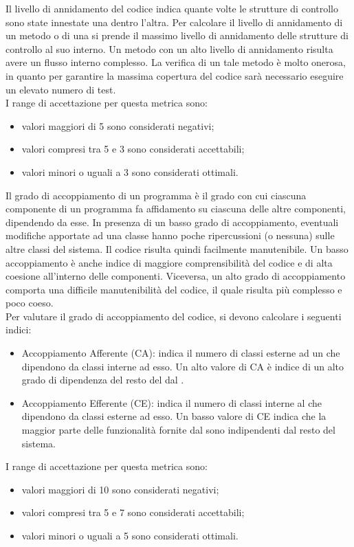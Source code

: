 			 \label{subsec:livAnnidamento}
			Il livello di annidamento del codice indica quante volte le strutture di controllo sono state innestate una dentro l'altra. Per calcolare il livello di annidamento di un metodo o di una  si prende il massimo livello di annidamento delle strutture di controllo al suo interno. Un metodo con un alto livello di annidamento risulta avere un flusso interno complesso. La verifica di un tale metodo è molto onerosa, in quanto per garantire la massima copertura del codice sarà necessario eseguire un elevato numero di test.\\
			I range di accettazione per questa metrica sono:
			\begin{itemize}
				\item valori maggiori di 5 sono considerati negativi;
				\item valori compresi tra 5 e 3 sono considerati accettabili;
				\item valori minori o uguali a 3 sono considerati ottimali.
			\end{itemize}
		 \label{subsec:gradoAccoppiamento}
		Il grado di accoppiamento di un programma è il grado con cui ciascuna componente di un programma fa affidamento su ciascuna delle altre componenti, dipendendo da esse. In presenza di un basso grado di accoppiamento, eventuali modifiche apportate ad una classe hanno poche ripercussioni (o nessuna) sulle altre classi del sistema. Il codice risulta quindi facilmente manutenibile. Un basso accoppiamento è anche indice di maggiore comprensibilità del codice e di alta coesione all'interno delle componenti. Viceversa, un alto grado di accoppiamento comporta una difficile manutenibilità del codice, il quale risulta più complesso e poco coeso.\\
		Per valutare il grado di accoppiamento del codice, si devono calcolare i seguenti indici:
		\begin{itemize}
			\item Accoppiamento Afferente (CA): indica il numero di classi esterne ad un  che dipendono da classi interne ad esso. Un alto valore di CA è indice di un alto grado di dipendenza del resto del  dal .
			\item Accoppiamento Efferente (CE): indica il numero di classi interne al  che dipendono da classi esterne ad esso. Un basso valore di CE indica che la maggior parte delle funzionalità fornite dal  sono indipendenti dal resto del sistema.
		\end{itemize}
		I range di accettazione per questa metrica sono:
		\begin{itemize}
			\item valori maggiori di 10 sono considerati negativi;
			\item valori compresi tra 5 e 7 sono considerati accettabili;
			\item valori minori o uguali a 5 sono considerati ottimali.
		\end{itemize}
			
